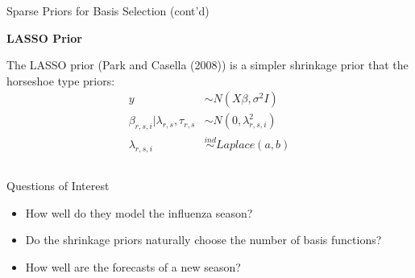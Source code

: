 \documentclass[final]{beamer}
\newlength{\onecolwid}
\newlength{\twocolwid}
\begin{document}
\begin{frame}[t]
\begin{columns}[t]
\begin{column}{\twocolwid}
\begin{columns}[t,totalwidth=\twocolwid]
\begin{column}{\onecolwid}
\begin{block}{Sparse Priors for Basis Selection (cont'd)}
\vspace{10mm}

\textbf{LASSO Prior}

The LASSO prior (Park and Casella (2008)) is a simpler shrinkage prior that the horseshoe type priors:
\begin{align}
y &\sim N(X\beta, \sigma^2 I) \nonumber \\
\beta_{r,s,i} | \lambda_{r,s}, \tau_{r,s} &\sim N(0, \lambda_{r,s,i}^2) \nonumber \\
\lambda_{r,s,i} &\overset{ind}{\sim} Laplace(a,b)
\end{align}

\end{block}


\end{column} %

\end{columns} %


\begin{alertblock}{Questions of Interest}

\begin{itemize}
  \item How well do they model the influenza season?
  \item Do the shrinkage priors naturally choose the number of basis functions?
  \item How well are the forecasts of a new season?
\end{itemize}

\end{alertblock} 


\end{column}
\end{columns}
\end{frame}
\end{document}

